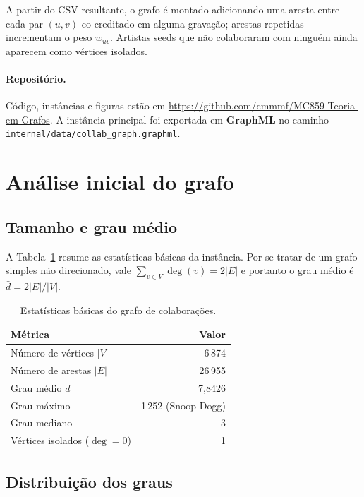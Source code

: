 \documentclass[11pt,a4paper]{article}
\begin{document}
A partir do CSV resultante, o grafo é montado adicionando uma aresta
entre cada par $(u,v)$ co-creditado em alguma gravação; arestas
repetidas incrementam o peso $w_{uv}$. Artistas seeds que não
colaboraram com ninguém ainda aparecem como vértices isolados.

\paragraph{Repositório.} Código, instâncias e figuras estão em
\url{https://github.com/cmmmf/MC859-Teoria-em-Grafos}. A instância
principal foi exportada em \textbf{GraphML} no caminho
\href{https://github.com/cmmmf/MC859-Teoria-em-Grafos/blob/main/internal/data/collab_graph.graphml}{\texttt{internal/data/collab\_graph.graphml}}.

\section{Análise inicial do grafo}

\subsection{Tamanho e grau médio}

A Tabela~\ref{tab:size} resume as estatísticas básicas da instância.
Por se tratar de um grafo simples não direcionado, vale
$\sum_{v\in V} \deg(v) = 2|E|$ e portanto o grau médio é
$\bar{d} = 2|E|/|V|$.

\begin{table}[H]
  \centering
  \begin{tabular}{lr}
    \toprule
    Métrica & Valor \\
    \midrule
    Número de vértices $|V|$        & 6\,874 \\
    Número de arestas  $|E|$        & 26\,955 \\
    Grau médio         $\bar{d}$    & 7{,}8426 \\
    Grau máximo                     & 1\,252 (Snoop Dogg) \\
    Grau mediano                    & 3 \\
    Vértices isolados ($\deg = 0$)  & 1 \\
    \bottomrule
  \end{tabular}
  \caption{Estatísticas básicas do grafo de colaborações.}
  \label{tab:size}
\end{table}

\subsection{Distribuição dos graus}
\end{document}
